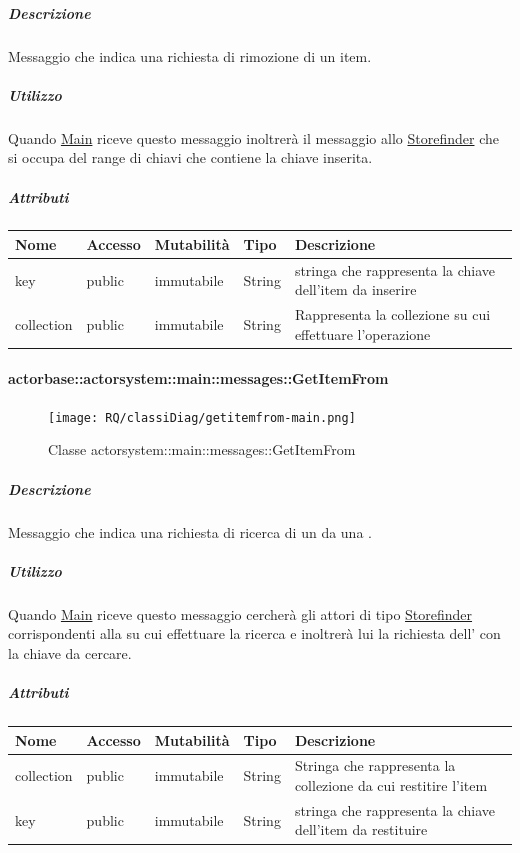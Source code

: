 \documentclass{scalatekids-article}
\begin{document}
\subparagraph{Descrizione}
Messaggio che indica una richiesta di rimozione di un item.

\subparagraph{Utilizzo}
Quando \hyperref[sec:actorbase::actorsystem::main::Main]{Main}
riceve questo messaggio inoltrerà il messaggio allo \hyperref[sec:actorbase::actorsystem::storefinder::Storefinder]{Storefinder}
che si occupa del range di chiavi che contiene la chiave inserita.

\subparagraph{Attributi}
\begin{tabular}{| p{3cm} | p{1.5cm} | p{2cm} | p{2cm} | p{8.5cm} |}
  \hline
  Nome & Accesso & Mutabilità & Tipo & Descrizione\\
  \hline
  key & public & immutabile & String & stringa che rappresenta la chiave dell'item da inserire \\
  \hline
  collection & public & immutabile & String & Rappresenta la collezione su cui effettuare l'operazione \\
  \hline
\end{tabular}

\paragraph{actorbase::actorsystem::main::messages::GetItemFrom}
\label{sec:actorbase::actorsystem::main::messages::GetItemFrom}

\begin{figure}[H]
   \begin{center}
     \texttt{[image: RQ/classiDiag/getitemfrom-main.png]}
     \caption{Classe actorsystem::main::messages::GetItemFrom}
   \end{center}
 \end{figure}

\subparagraph{Descrizione}

Messaggio che indica una richiesta di ricerca di un  da una .

\subparagraph{Utilizzo}

Quando \hyperref[sec:actorbase::actorsystem::main::Main]{Main}
riceve questo messaggio cercherà gli attori di tipo
\hyperref[sec:actorbase::actorsystem::storefinder::Storefinder]{Storefinder}
corrispondenti alla  su cui effettuare la ricerca
e inoltrerà lui la richiesta dell' con la chiave da cercare.

\subparagraph{Attributi}
\begin{tabular}{| p{3cm} | p{1.5cm} | p{2cm} | p{2cm} | p{8.5cm} |}
  \hline
  Nome & Accesso & Mutabilità & Tipo & Descrizione\\
  \hline
  collection & public & immutabile & String & Stringa che rappresenta la collezione da cui restitire l'item\\
  \hline
  key & public & immutabile & String & stringa che rappresenta la chiave dell'item da restituire \\
  \hline
\end{tabular}
\end{document}
